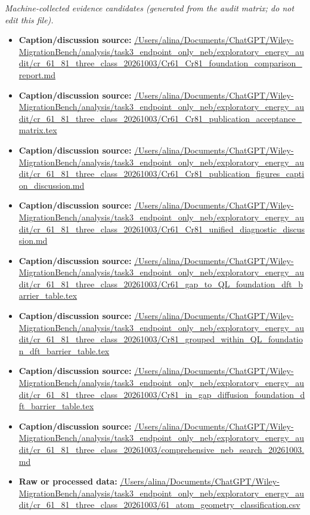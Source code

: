 \emph{Machine-collected evidence candidates (generated from the audit matrix; do not edit this file).}
\begin{itemize}[leftmargin=1.4em,noitemsep]
\item \textbf{Caption/discussion source:} \url{/Users/alina/Documents/ChatGPT/Wiley-MigrationBench/analysis/task3_endpoint_only_neb/exploratory_energy_audit/cr_61_81_three_class_20261003/Cr61_Cr81_foundation_comparison_report.md}
\item \textbf{Caption/discussion source:} \url{/Users/alina/Documents/ChatGPT/Wiley-MigrationBench/analysis/task3_endpoint_only_neb/exploratory_energy_audit/cr_61_81_three_class_20261003/Cr61_Cr81_publication_acceptance_matrix.tex}
\item \textbf{Caption/discussion source:} \url{/Users/alina/Documents/ChatGPT/Wiley-MigrationBench/analysis/task3_endpoint_only_neb/exploratory_energy_audit/cr_61_81_three_class_20261003/Cr61_Cr81_publication_figures_caption_discussion.md}
\item \textbf{Caption/discussion source:} \url{/Users/alina/Documents/ChatGPT/Wiley-MigrationBench/analysis/task3_endpoint_only_neb/exploratory_energy_audit/cr_61_81_three_class_20261003/Cr61_Cr81_unified_diagnostic_discussion.md}
\item \textbf{Caption/discussion source:} \url{/Users/alina/Documents/ChatGPT/Wiley-MigrationBench/analysis/task3_endpoint_only_neb/exploratory_energy_audit/cr_61_81_three_class_20261003/Cr61_gap_to_QL_foundation_dft_barrier_table.tex}
\item \textbf{Caption/discussion source:} \url{/Users/alina/Documents/ChatGPT/Wiley-MigrationBench/analysis/task3_endpoint_only_neb/exploratory_energy_audit/cr_61_81_three_class_20261003/Cr81_grouped_within_QL_foundation_dft_barrier_table.tex}
\item \textbf{Caption/discussion source:} \url{/Users/alina/Documents/ChatGPT/Wiley-MigrationBench/analysis/task3_endpoint_only_neb/exploratory_energy_audit/cr_61_81_three_class_20261003/Cr81_in_gap_diffusion_foundation_dft_barrier_table.tex}
\item \textbf{Caption/discussion source:} \url{/Users/alina/Documents/ChatGPT/Wiley-MigrationBench/analysis/task3_endpoint_only_neb/exploratory_energy_audit/cr_61_81_three_class_20261003/comprehensive_neb_search_20261003.md}
\item \textbf{Raw or processed data:} \url{/Users/alina/Documents/ChatGPT/Wiley-MigrationBench/analysis/task3_endpoint_only_neb/exploratory_energy_audit/cr_61_81_three_class_20261003/61_atom_geometry_classification.csv}

\end{itemize}
